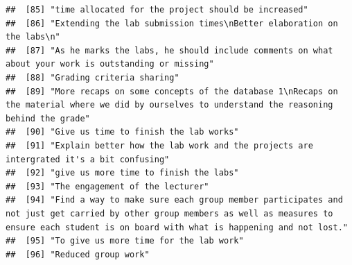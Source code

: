 \documentclass[
]{article}
\begin{document}
\begin{verbatim}
##  [85] "time allocated for the project should be increased"                                                                                                                                                                    
##  [86] "Extending the lab submission times\nBetter elaboration on the labs\n"                                                                                                                                                  
##  [87] "As he marks the labs, he should include comments on what about your work is outstanding or missing"                                                                                                                    
##  [88] "Grading criteria sharing"                                                                                                                                                                                              
##  [89] "More recaps on some concepts of the database 1\nRecaps on the material where we did by ourselves to understand the reasoning behind the grade"                                                                         
##  [90] "Give us time to finish the lab works"                                                                                                                                                                                  
##  [91] "Explain better how the lab work and the projects are intergrated it's a bit confusing"                                                                                                                                 
##  [92] "give us more time to finish the labs"                                                                                                                                                                                  
##  [93] "The engagement of the lecturer"                                                                                                                                                                                        
##  [94] "Find a way to make sure each group member participates and not just get carried by other group members as well as measures to ensure each student is on board with what is happening and not lost."                    
##  [95] "To give us more time for the lab work"                                                                                                                                                                                 
##  [96] "Reduced group work"                                                                                                                                                                                                    

\end{verbatim}
\end{document}
